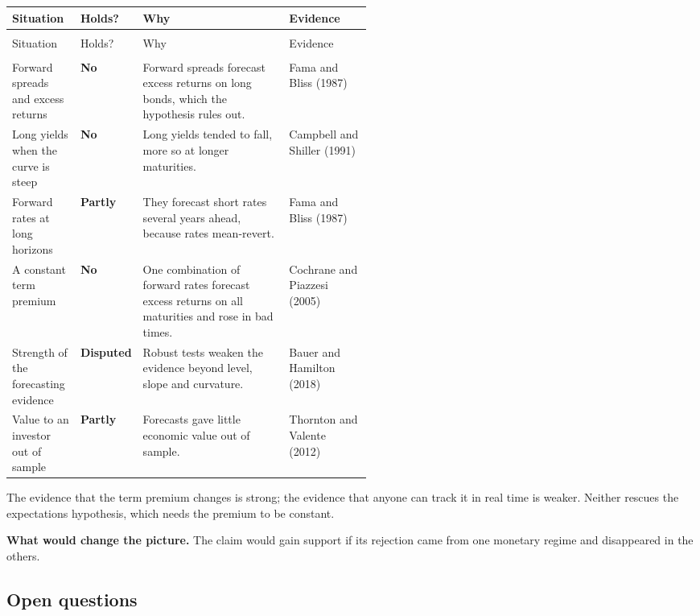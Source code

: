{\small
\begin{longtable}{@{}>{\raggedright\arraybackslash}p{0.19\linewidth}>{\raggedright\arraybackslash}p{0.10\linewidth}>{\raggedright\arraybackslash}p{}>{\raggedright\arraybackslash}p{0.23\linewidth}@{}}
\toprule
Situation & Holds? & Why & Evidence \\
\midrule
\endfirsthead
\multicolumn{4}{@{}l}{\emph{(continued)}} \\
\toprule
Situation & Holds? & Why & Evidence \\
\midrule
\endhead
\midrule
\multicolumn{4}{r@{}}{\emph{(continued on the next page)}} \\
\endfoot
\bottomrule
\endlastfoot
Forward spreads and excess returns & \textbf{No} & Forward spreads forecast excess returns on long bonds, which the hypothesis rules out. & Fama and Bliss (1987) \\
\addlinespace[3pt]
Long yields when the curve is steep & \textbf{No} & Long yields tended to fall, more so at longer maturities. & Campbell and Shiller (1991) \\
\addlinespace[3pt]
Forward rates at long horizons & \textbf{Partly} & They forecast short rates several years ahead, because rates mean-revert. & Fama and Bliss (1987) \\
\addlinespace[3pt]
A constant term premium & \textbf{No} & One combination of forward rates forecast excess returns on all maturities and rose in bad times. & Cochrane and Piazzesi (2005) \\
\addlinespace[3pt]
Strength of the forecasting evidence & \textbf{Disputed} & Robust tests weaken the evidence beyond level, slope and curvature. & Bauer and Hamilton (2018) \\
\addlinespace[3pt]
Value to an investor out of sample & \textbf{Partly} & Forecasts gave little economic value out of sample. & Thornton and Valente (2012) \\
\end{longtable}
}

The evidence that the term premium changes is strong; the evidence that anyone can track it in real time is weaker. Neither rescues the expectations hypothesis, which needs the premium to be constant.

\textbf{What would change the picture.} The claim would gain support if its rejection came from one monetary regime and disappeared in the others.

\subsection{Open questions}
\label{sec:07-open}

